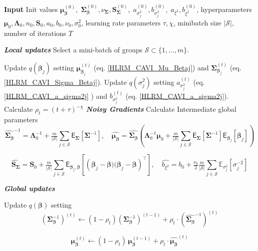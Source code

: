 \begin{algorithm}[H]
\caption{SVI for HLRM}
\begin{algorithmic}
\State \textbf{Input} Init values $
\bm{\mu}_{\bm{\beta}}^{(0)},\; \bm{\Sigma}_{\bm{\beta}}^{(0)},\nu_{\bm{\Sigma}}, \bm{S}_{\bm{\Sigma}}^{(0)},\; a_{\sigma_j^2}^{(0)}, b_{\sigma_j^2}^{(0)},\; a_{\xi^2}, b_{\xi^2}^{(0)}$, hyperparameters $\bm{\mu}_0,\bm{\Lambda}_0,n_0,\bm{S}_0,a_0,b_0,\nu_0,\sigma_0^2$, learning rate parameters $\tau,\chi$, minibatch size $|\mathcal{S}|$, number of iterations $T$

    \State \textbf{\textit{Local updates}}
  \State Select a mini-batch of groups $\mathcal{S} \subset \{1,\dots,m\}$.


    \State Update $q(\bm{\beta}_j)$ setting $\bm{\mu}_{\bm{\beta}_j}^{(t)}$ (eq. \ref{HLRM_CAVI_Mu_Betaj}) and $\bm{\Sigma}_{\bm{\beta}_j}^{(t)}$ (eq. \ref{HLRM_CAVI_Sigma_Betaj}).
\State Update $q(\sigma^2_j)$ setting $a_{\sigma_j^2}^{(t)}$ (eq. \ref{HLRM_CAVI_a_sigma2j} ) and $b_{\sigma_j^2}^{(t)}$ (eq. \ref{HLRM_CAVI_a_sigma2j}).
  \EndFor
  \State Calculate $\rho_t = (t+\tau)^{-\chi}$
   \State \textbf{\textit{Noisy Gradients}}
  \State Calculate Intermediate global parameters
   $$
  \hat{\bm{\Sigma}_{\bm{\beta}}}^{-1} =\bm{\Lambda}_0^{-1} + \tfrac{m}{|\mathcal{S}|}\sum_{j \in \mathcal{S}} \mathsf{E}_{\bm{\Sigma}}\left[\bm{\Sigma}^{-1}\right], \quad \hat{\bm{\mu}_{\bm{\beta}}} = \hat{\bm{\Sigma}_{\bm{\beta}}}\left(\bm{\Lambda}_0^{-1}\bm{\mu}_0 + \tfrac{m}{|\mathcal{S}|}\sum_{j \in \mathcal{S}}
  \mathsf{E}_{\bm{\Sigma}}\left[\bm{\Sigma}^{-1}\right]
  \mathsf{E}_{\bm{\beta}_j}\left[\bm{\beta}_j \right]\right) 
  $$
  
  $$
  \hat{\bm{S}_{\bm{\Sigma}}} = \bm{S}_0 +\tfrac{m}{|\mathcal{S}|}\sum_{j \in \mathcal{S}} \mathsf{E}_{\bm{\beta}_j,\bm{\beta}}\left[\left(\bm{\beta}_j - \bm{\beta})(\bm{\beta}_j - \bm{\beta}\right)^\top\right], \quad
  \hat{b_{\xi^2}} = b_0 + \tfrac{\nu_0}{2}\tfrac{m}{|\mathcal{S}|}\sum_{j \in \mathcal{S}} \mathbb{E}_{\sigma_j^2}[\sigma_j^{-2}]
  $$

   \State \textbf{\textit{Global updates}}

  \State Update $q (\bm{\beta})$ setting
  $$
  \left(\bm{\Sigma}_{\bm{\beta}}^{-1}\right)^{(t)} \leftarrow (1-\rho_t)\left(\bm{\Sigma}_{\bm{\beta}}^{-1}\right)^{(t-1)} + \rho_t \cdot \left(\hat{\bm{\Sigma}_{\bm{\beta}}}^{-1}\right)^{(t)}
  $$
  
  \State $$
  \bm{\mu}_{\bm{\beta}}^{(t)} \leftarrow (1-\rho_t)\,\bm{\mu}_{\bm{\beta}}^{(t-1)} + \rho_t \cdot\hat{\bm{\mu}_{\bm{\bm{\beta}}}}^{(t)}
  $$
  

\end{algorithmic}
\end{algorithm}
